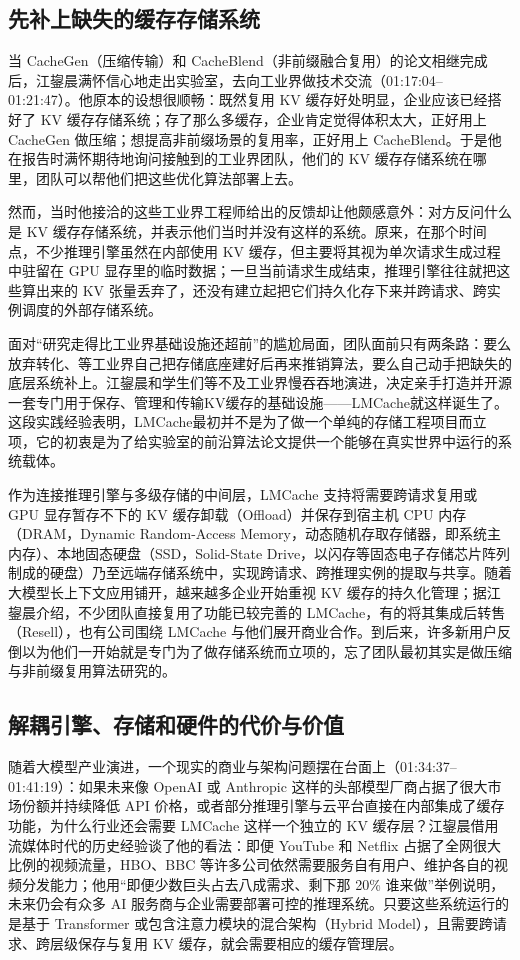 \documentclass[UTF8,a4paper,11pt,fontset=fandol]{ctexart}
\begin{document}
\subsection{先补上缺失的缓存存储系统}
当 CacheGen（压缩传输）和 CacheBlend（非前缀融合复用）的论文相继完成后，江鋆晨满怀信心地走出实验室，去向工业界做技术交流（01:17:04–01:21:47）。他原本的设想很顺畅：既然复用 KV 缓存好处明显，企业应该已经搭好了 KV 缓存存储系统；存了那么多缓存，企业肯定觉得体积太大，正好用上 CacheGen 做压缩；想提高非前缀场景的复用率，正好用上 CacheBlend。于是他在报告时满怀期待地询问接触到的工业界团队，他们的 KV 缓存存储系统在哪里，团队可以帮他们把这些优化算法部署上去。

然而，当时他接洽的这些工业界工程师给出的反馈却让他颇感意外：对方反问什么是 KV 缓存存储系统，并表示他们当时并没有这样的系统。原来，在那个时间点，不少推理引擎虽然在内部使用 KV 缓存，但主要将其视为单次请求生成过程中驻留在 GPU 显存里的临时数据；一旦当前请求生成结束，推理引擎往往就把这些算出来的 KV 张量丢弃了，还没有建立起把它们持久化存下来并跨请求、跨实例调度的外部存储系统。

面对“研究走得比工业界基础设施还超前”的尴尬局面，团队面前只有两条路：要么放弃转化、等工业界自己把存储底座建好后再来推销算法，要么自己动手把缺失的底层系统补上。江鋆晨和学生们等不及工业界慢吞吞地演进，决定亲手打造并开源一套专门用于保存、管理和传输KV缓存的基础设施——LMCache就这样诞生了。这段实践经验表明，LMCache最初并不是为了做一个单纯的存储工程项目而立项，它的初衷是为了给实验室的前沿算法论文提供一个能够在真实世界中运行的系统载体。

作为连接推理引擎与多级存储的中间层，LMCache 支持将需要跨请求复用或 GPU 显存暂存不下的 KV 缓存卸载（Offload）并保存到宿主机 CPU 内存（DRAM，Dynamic Random-Access Memory，动态随机存取存储器，即系统主内存）、本地固态硬盘（SSD，Solid-State Drive，以闪存等固态电子存储芯片阵列制成的硬盘）乃至远端存储系统中，实现跨请求、跨推理实例的提取与共享。随着大模型长上下文应用铺开，越来越多企业开始重视 KV 缓存的持久化管理；据江鋆晨介绍，不少团队直接复用了功能已较完善的 LMCache，有的将其集成后转售（Resell），也有公司围绕 LMCache 与他们展开商业合作。到后来，许多新用户反倒以为他们一开始就是专门为了做存储系统而立项的，忘了团队最初其实是做压缩与非前缀复用算法研究的。

\subsection{解耦引擎、存储和硬件的代价与价值}
随着大模型产业演进，一个现实的商业与架构问题摆在台面上（01:34:37–01:41:19）：如果未来像 OpenAI 或 Anthropic 这样的头部模型厂商占据了很大市场份额并持续降低 API 价格，或者部分推理引擎与云平台直接在内部集成了缓存功能，为什么行业还会需要 LMCache 这样一个独立的 KV 缓存层？江鋆晨借用流媒体时代的历史经验谈了他的看法：即便 YouTube 和 Netflix 占据了全网很大比例的视频流量，HBO、BBC 等许多公司依然需要服务自有用户、维护各自的视频分发能力；他用“即便少数巨头占去八成需求、剩下那 20\% 谁来做”举例说明，未来仍会有众多 AI 服务商与企业需要部署可控的推理系统。只要这些系统运行的是基于 Transformer 或包含注意力模块的混合架构（Hybrid Model），且需要跨请求、跨层级保存与复用 KV 缓存，就会需要相应的缓存管理层。
\end{document}
